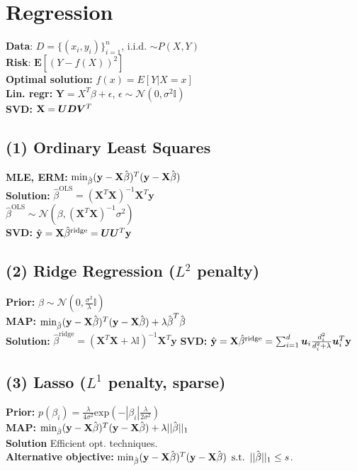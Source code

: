 \section*{Regression}
\textbf{Data}:
$D=\{(x_i,y_i)\}_{i=1}^n$, i.i.d. $\sim P(X,Y)$\\
\textbf{Risk}:
$\mathbf{E}[(Y - f(X))^2]$\\
\textbf{Optimal solution:} $f(x) = E[Y|X=x]$\\
\textbf{Lin. regr:}
$\mathbf{Y}=X^T\beta + \epsilon$, $\epsilon \sim \mathcal{N}(0,\sigma^2\mathbb{I})$\\
\textbf{SVD:} $\mathbf{X} = {\bm{U}}{\bm{D}}{\bm{V}}^T$


\subsection*{(1) Ordinary Least Squares}
\textbf{MLE, ERM:} $\min_{\hat{\kern0pt \beta}}(\mathbf{y}-\mathbf{X}\hat{\kern0pt \beta})^T(\mathbf{y}-\mathbf{X}\hat{\kern0pt \beta})$\\
\textbf{Solution:} $\hat{\beta}^\text{OLS} = (\mathbf{X}^T\mathbf{X})^{-1}\mathbf{X}^{T}\mathbf{y}$\\
$\hat{\beta}^\textrm{OLS} \sim \mathcal{N}(\beta, (\mathbf{X}^T\mathbf{X})^{-1}\sigma^2)$\\
\textbf{SVD:} $\hat{\mathbf{y}} = \mathbf{X}\hat{\beta}^\text{ridge} = {\bm{U}}{\bm{U}}^T\mathbf{y}$

\subsection*{(2) Ridge Regression ($L^2$ penalty)}
\textbf{Prior:} $\beta \sim \mathcal{N}(0, \frac{\sigma^2}{\lambda}\mathbb{I})$\\
\textbf{MAP:} $\min_{\hat{\kern0pt \beta}}(\mathbf{y}-\mathbf{X}\hat{\kern0pt \beta})^T(\mathbf{y}-\mathbf{X}\hat{\kern0pt \beta})+\lambda\hat{\kern0pt \beta}^T\hat{\kern0pt \beta}$\\
\textbf{Solution:} $\hat{\beta}^\text{ridge} = (\mathbf{X}^T\mathbf{X}+\lambda\mathbb{I})^{-1}\mathbf{X}^{T}\mathbf{y}$
\textbf{SVD:} $\hat{\mathbf{y}} = \mathbf{X}\hat{\beta}^\text{ridge} = \sum_{i=1}^d{{\bm{u}}_i\frac{d_i^2}{d_i^2+\lambda}{\bm{u}}_i^T\mathbf{y}}$

\subsection*{(3) Lasso ($L^1$ penalty, sparse)}
\textbf{Prior:} $p(\beta_i) = \frac{\lambda}{4\sigma^2}\mathrm{exp}(-|\beta_i|\frac{\lambda}{2\sigma^2})$\\
\textbf{MAP:} $\min_{\hat{\kern0pt \beta}}(\mathbf{y}-\mathbf{X}\hat{\kern0pt \beta})^T(\mathbf{y}-\mathbf{X}\hat{\kern0pt \beta})+\lambda||\hat{\kern0pt \beta}||_1$\\
\textbf{Solution} Efficient opt. techniques.\\
\textbf{Alternative objective:} $\min_{\hat{\kern0pt \beta}}(\mathbf{y}-\mathbf{X}\hat{\kern0pt \beta})^T(\mathbf{y}-\mathbf{X}\hat{\kern0pt \beta})\,\,\, \mathrm{s.t.}\,\,\, ||\hat{\kern0pt \beta}||_1 \leq s$.

